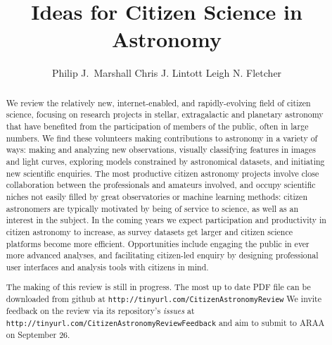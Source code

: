 \documentclass{ar2e}
\def\url#1{\texttt{#1}}
\begin{document}

\jvol{}
\ARinfo{}

\title{Ideas for Citizen Science in Astronomy}

\author{%
Philip J.\ Marshall
Chris J. Lintott
Leigh N. Fletcher
}




\begin{abstract} 

We review the relatively new, internet-enabled, and rapidly-evolving field of
citizen science, focusing on research projects in stellar, extragalactic and 
planetary astronomy that have benefited from the participation of members of
the public, often in large numbers. We find these volunteers making
contributions to astronomy in a variety of ways: making and analyzing new
observations, visually classifying features in images and light curves,
exploring models constrained by astronomical datasets, and initiating new
scientific enquiries.  The most productive citizen astronomy projects involve
close collaboration between the professionals and amateurs involved, and occupy
scientific niches not easily filled by great observatories or machine learning
methods: citizen astronomers are typically motivated by being of service to
science, as well as an interest in the subject. In the coming years we expect participation and productivity in citizen
astronomy to increase, as survey datasets get larger and citizen science
platforms become more efficient. Opportunities include engaging the public in
ever more advanced analyses, and facilitating citizen-led enquiry by designing
professional user interfaces and analysis tools with citizens in mind.

\medskip The making of this review is still in progress. The most up to date PDF
file can be downloaded from github at 
\url{http://tinyurl.com/CitizenAstronomyReview} We invite feedback on the review
via its repository's {\it issues} at 
\url{http://tinyurl.com/CitizenAstronomyReviewFeedback} and aim to submit to
ARAA on September 26.

\end{abstract}
\end{document}

